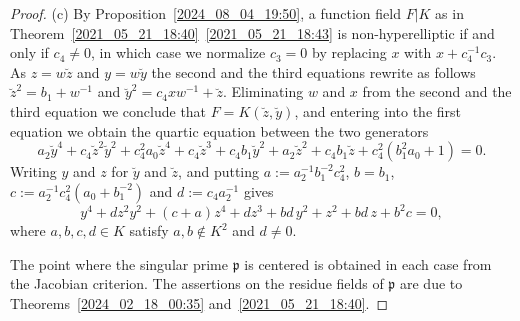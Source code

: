 \documentclass[12pt,reqno]{amsart}
\newcommand{\todee}[2][]{\todo[color=yellow, #1]{#2}} %
\theoremstyle{definition}
\newcommand{\pp}{\mathfrak{p}}
\newcommand{\ka}{\kappa}
\begin{document}
\begin{proof}
(c)
By Proposition~\ref{2024_08_04_19:50}, a function field $F|K$ as in Theorem~\ref{2021_05_21_18:40}~\ref{2021_05_21_18:43} is non-hyperelliptic if and only if $c_4\neq 0$, in which case we normalize $c_3=0$ by replacing $x$ with $x + c_4^{-1}c_3$.
As $z = w \breve z$ and $y = w \breve y$ the second and the third equations rewrite as follows $\breve z^2 = b_1+w^{-1}$ and $\breve y^2 = c_4 x w^{-1} + \breve z$. Eliminating $w$ and $x$ from the second and the third equation we conclude that $F=K(\breve z,\breve y)$, and entering into the first equation we obtain the quartic equation between the two generators
\[ a_2 \breve y^4 + c_4 \breve{z}^2 \breve y^2 + c_4^2 a_0 \breve{z}^4 + c_4 \breve{z}^3 + c_4 b_1 \breve y^2 + a_2 \breve{z}^2 + c_4 b_1 \breve{z} + c_4^2 (b_1^2 a_0 + 1) = 0. \]
Writing $y$ and $z$ for $\breve y$ and $\breve z$, and putting $a:= a_2^{-1} b_1^{-2} c_4^2$, $b= b_1$, $c:= a_2^{-1} c_4^2 (a_0 + b_1^{-2})$ and $d:= c_4 a_2^{-1}$ gives
\[ y^4 + d z^2 y^2 + (c+a) z^4 + d z^3 + bd\, y^2 + z^2 + bd\, z + b^2 c = 0, \]
where $a,b,c,d\in K$ satisfy $a,b\notin K^2$ and $d\neq 0$.

The point where the singular prime $\pp$ is centered is obtained in each case from the Jacobian criterion. The assertions on the residue fields of $\pp$ are due to Theorems~\ref{2024_02_18_00:35} and~\ref{2021_05_21_18:40}.
\end{proof}
\end{document}
